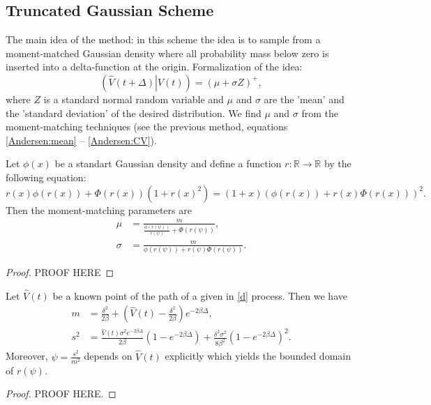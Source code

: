         \subsection{Truncated Gaussian Scheme}
            The main idea of the method: in this scheme the idea is to sample from a moment-matched Gaussian density where all probability
            mass below zero is inserted into a delta-function at the origin. Formalization of the idea:
            \begin{equation}
                \left(\left.\hat{V}(t+\Delta)\right| V(t)\right) = \left(\mu + \sigma Z\right)^+,
            \end{equation}
            where $Z$ is a standard normal random variable and $\mu$ and $\sigma$ are the 'mean' and the 'standard deviation' of the desired distribution.
            We find $\mu$ and $\sigma$ from the moment-matching techniques (see the previous method,  equations \eqref{Andersen:mean} -- \eqref{Andersen:CV}).

            \begin{lemma}
                Let $\phi(x)$ be a standart Gaussian density and define a function $r:\mathbb{R} \to \mathbb{R}$ by the following equation:
                \begin{equation}
                    r(x)\phi(r(x))+\Phi(r(x))(1+r(x)^2)= (1+x)\left(\phi(r(x)) + r(x)\Phi(r(x))\right)^2.
                \end{equation}
                Then the moment-matching parameters are
                \begin{align}
                    \mu &= \frac{m}{\frac{\phi(r(\psi))}{r(\psi)} + \Phi(r(\psi))},\\ 
                    \sigma &= \frac{m}{\phi(r(\psi)) + r(\psi)\Phi(r(\psi))}.
                \end{align}
            \end{lemma}
            \begin{proof}
                {\color{red}PROOF HERE}
            \end{proof}

        \begin{lemma}
            Let $\hat{V}(t)$ be a known point of the path of a given in \eqref{d} process. Then we have
            \begin{align}
                m   &= \frac{\delta^2}{2\beta} + \left(\hat{V}(t) - \frac{\delta^2}{2\beta}\right)e^{-2\beta \Delta},\\
                s^2 &= \frac{\hat{V}(t)\sigma^2e^{-2\beta \Delta}}{2\beta}\left(1 - e^{-2\beta \Delta}\right) + \frac{\delta^2\sigma^2}{8\beta^2}\left(1 - e^{-2\beta \Delta}\right)^2.
            \end{align}
            Moreover, $\psi = \frac{s^2}{m^2}$ depends on $\hat{V}(t)$ explicitly which yields the bounded domain of $r(\psi)$.
        \end{lemma}
        \begin{proof}
            {\color{red}PROOF HERE.}
            
        \end{proof}

